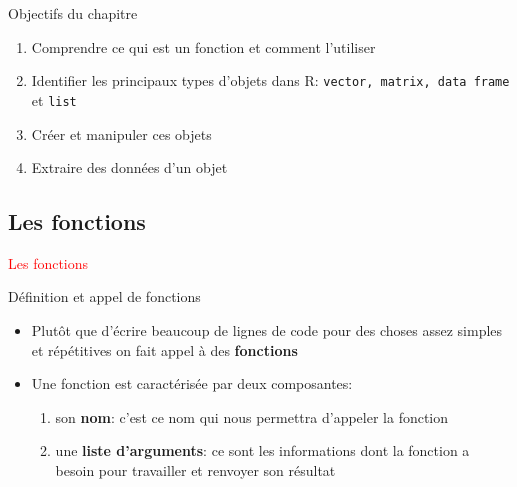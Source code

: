 \documentclass[11pt]{beamer}\usepackage[]{graphicx}\usepackage[]{color}
\newcommand{\code}[1]{\texttt{#1}}
\begin{document}
\begin{frame}[plain]
\hspace*{-1.0cm}\parbox[t]{\textwidth}{
\begin{block}{Objectifs du chapitre}
\begin{enumerate}
\item Comprendre ce qui est un fonction et comment l'utiliser
\item Identifier les principaux types d'objets dans R: \code{vector, matrix, data frame} et \code{list} 
\item Cr\'{e}er et manipuler ces objets
\item Extraire des donn\'{e}es d'un objet
\end{enumerate}
\end{block}
}
\end{frame}





\subsection{Les fonctions}

\begin{frame}
 \begin{center}
  \Huge{\textcolor{red}{Les fonctions}}
 \end{center}
\end{frame}



\begin{frame}{Définition et appel de fonctions}
\begin{itemize}
 \setlength\itemsep{2em}
\item Plutôt que d'écrire beaucoup de lignes de code pour des choses assez simples et répétitives on fait appel à des \textbf{fonctions}
\pause \item Une fonction est caractérisée par deux composantes:
\pause \begin{enumerate}
\normalsize
\item son \textbf{nom}: c'est ce nom qui nous permettra d'appeler la fonction
\pause \item une \textbf{liste d'arguments}: ce sont les informations dont la fonction a besoin pour travailler et renvoyer son résultat
\end{enumerate}
\end{itemize}
\end{frame}
\end{document}
